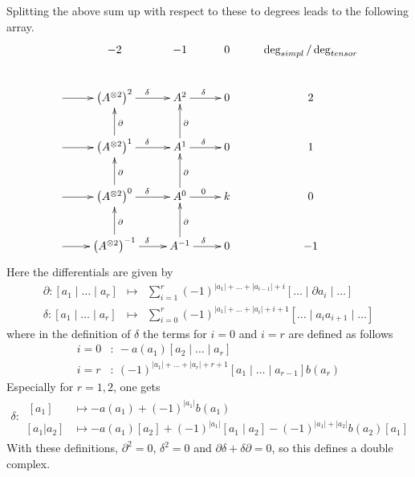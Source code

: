 Splitting the above sum up with respect to these to degrees leads to the following array.
\[
\begin{xy}
\xymatrix{
  & {-2} & {-1} & {0} & {\deg_{simpl} / \deg_{tensor}} \\ 
  {\ar[r]} & {\left(A^{\otimes 2} \right)^2 \ar[r]^\delta } & {A^2 \ar[r]^\delta} & {0} & {2} \\
  {\ar[r]} & {\left(A^{\otimes 2} \right)^1 \ar[r]^\delta \ar[u]_\partial} & {A^1 \ar[r]^\delta \ar[u]_\partial} & {0} & {1} \\
  {\ar[r]} & {\left(A^{\otimes 2} \right)^0 \ar[r]^\delta \ar[u]_\partial} & {A^0 \ar[r]^0 \ar[u]_\partial} & {k} & {0} \\
  {\ar[r]} & {\left(A^{\otimes 2} \right)^{-1} \ar[r]^\delta \ar[u]_\partial} & {A^{-1} \ar[r]^\delta \ar[u]_\partial} & {0} & {-1} \\
}\end{xy} 
\]
Here the differentials are given by
\begin{eqnarray*}
\partial : [a_1 \mid \ldots \mid a_r] & \mapsto & \sum_{i=1}^r (-1)^{|a_1| + \ldots + |a_{i-1}| + i} [\ldots \mid \partial a_i \mid \ldots ] \\
\delta : [a_1 \mid \ldots \mid a_r] & \mapsto & \sum_{i=0}^{r} (-1)^{|a_1| + \ldots + |a_i| + i + 1} [\ldots \mid a_i a_{i+1} \mid \ldots]
\end{eqnarray*}
where in the definition of $\delta$ the terms for $i=0$ and $i=r$ are defined as follows 
\begin{align*}
i=0 &: \  - a(a_1) [a_2 \mid \ldots \mid a_r] \\
i=r &: \  (-1)^{|a_1|+\ldots +|a_r|+r+1} [a_1 \mid \ldots \mid a_{r-1}] b(a_r) 
\end{align*}
Especially for $r=1,2$, one gets 
\begin{align*}
\delta : 
\begin{aligned} \ 
  [a_1] &\mapsto -a(a_1) + (-1)^{|a_1|} b(a_1) \\
  [a_1 | a_2] &\mapsto -a(a_1)[a_2] + (-1)^{|a_1|} [a_1 \mid a_2] - (-1)^{|a_1| + |a_2|} b(a_2) [a_1] 
  \end{aligned} 
\end{align*}
With these definitions, $\partial^2 = 0$, $\delta^2 = 0$ and $\partial \delta + \delta \partial = 0$, so this defines a double complex. %


